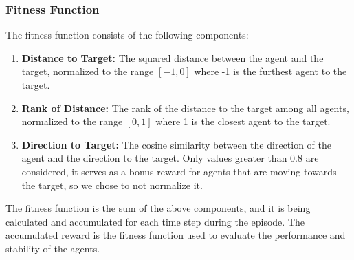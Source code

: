 \documentclass[sigconf]{acmart}
\begin{document}
\subsubsection{Fitness Function}
The fitness function consists of the following components:
\begin{enumerate}
  \item \textbf{Distance to Target:} The squared distance between the agent and the target, normalized to the range $[-1, 0]$ where -1 is the furthest agent to the target.
  \item \textbf{Rank of Distance:} The rank of the distance to the target among all agents, normalized to the range $[0, 1]$ where 1 is the closest agent to the target.
  \item \textbf{Direction to Target:} The cosine similarity between the direction of the agent and the direction to the target. Only values greater than 0.8 are considered, it serves as a bonus reward for agents that are moving towards the target, so we chose to not normalize it.
\end{enumerate}
The fitness function is the sum of the above components, and it is being calculated and accumulated for each time step during the episode.
The accumulated reward is the fitness function used to evaluate the performance and stability of the agents.
\end{document}
